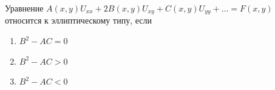 Уравнение \(A\left(x,y\right)U_{xx}+2B\left(x,y\right)U_{xy}+C\left(x,y\right)U_{yy}+\dots =F\left(x,y\right)\) относится к эллиптическому типу, если

\begin{enumerate}[label=\arabic*)]
    \item \(B^2-AC=0\)
    \item \(B^2-AC>0\)
    \item \(B^2-AC<0\)
\end{enumerate}

